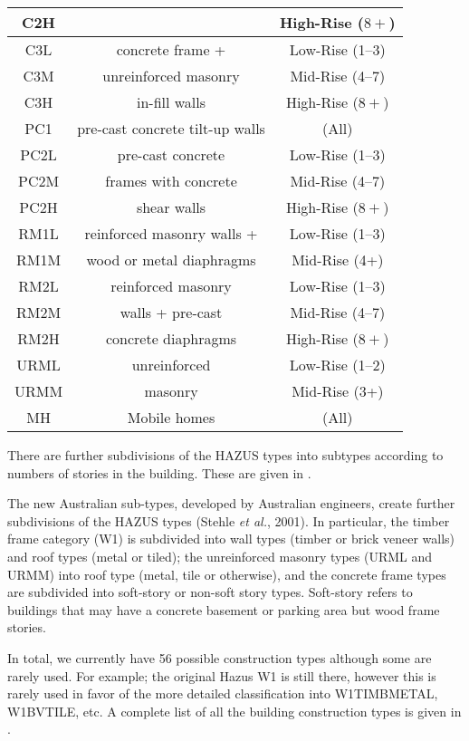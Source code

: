 \begin{table}
\begin{tabular}{|c|c|c|}
C2H & & High-Rise ($8+$)\\
\hline
C3L & concrete frame + & Low-Rise (1--3)\\
C3M & unreinforced masonry & Mid-Rise (4--7)\\
C3H & in-fill walls & High-Rise ($8+$)\\
\hline
PC1 & pre-cast concrete tilt-up walls & (All)\\
\hline
PC2L & pre-cast concrete  & Low-Rise (1--3)\\
PC2M &  frames with concrete  & Mid-Rise (4--7)\\
PC2H & shear walls & High-Rise ($8+$)\\
\hline
RM1L & reinforced masonry walls + & Low-Rise (1--3)\\
RM1M & wood or metal diaphragms  & Mid-Rise (4+)\\
\hline
RM2L & reinforced masonry & Low-Rise (1--3)\\
RM2M & walls + pre-cast & Mid-Rise (4--7)\\
RM2H & concrete diaphragms & High-Rise ($8+$)\\
\hline
URML & unreinforced & Low-Rise (1--2)\\
URMM & masonry & Mid-Rise (3+)\\
\hline
MH & Mobile homes & (All)\\
  \hline
\end{tabular}
\end{table}
There are further subdivisions of the HAZUS types into subtypes
according to numbers of stories in the building. These are given
in .

The new Australian sub-types, developed by Australian engineers, 
create further subdivisions of the HAZUS types
(Stehle \textit{et al.}, 2001). %
In particular, the timber frame category
(W1) is subdivided into wall types (timber or brick veneer walls)
and roof types (metal or tiled); the unreinforced masonry types
(URML and URMM) into roof type (metal, tile or  otherwise), and
the concrete frame types are subdivided into soft-story or
non-soft story types. Soft-story refers to buildings that may have
a concrete basement or parking area but wood frame stories.

In total, we currently have 56 possible construction types
although some are rarely used. For example; the original Hazus W1
is still there, however this is rarely used in favor of the more
detailed classification into W1TIMBMETAL, W1BVTILE, etc. A
complete list of all the building construction types is given in
. 


